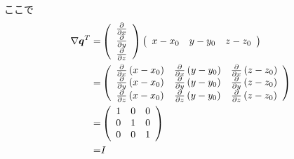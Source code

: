 ここで
\begin{align}
\nabla\bm{q}^T=&
\left(
\begin{array}{c}
\strut\frac{\partial}{\partial x}\\
\strut\frac{\partial}{\partial y}\\
\strut\frac{\partial}{\partial z}
\end{array}
\right)
\left(
\begin{array}{ccc}
x-x_0 & y-y_0 & z-z_0
\end{array}
\right)\\
=&
\left(
\begin{array}{ccc}
\strut
\frac{\partial}{\partial x} \left(x-x_0\right) &
\frac{\partial}{\partial x} \left(y-y_0\right) &
\frac{\partial}{\partial x} \left(z-z_0\right) \\
\strut
\frac{\partial}{\partial y} \left(x-x_0\right) &
\frac{\partial}{\partial y} \left(y-y_0\right) &
\frac{\partial}{\partial y} \left(z-z_0\right) \\
\strut
\frac{\partial}{\partial z} \left(x-x_0\right) &
\frac{\partial}{\partial z} \left(y-y_0\right) &
\frac{\partial}{\partial z} \left(z-z_0\right)
\end{array}
\right)\\
=&
\left(
\begin{array}{ccc}
1 & 0 & 0 \\
0 & 1 & 0 \\
0 & 0 & 1
\end{array}
\right)\\
=&I
\end{align}

